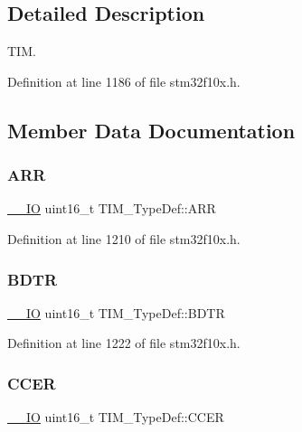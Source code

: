\subsection{Detailed Description}
T\+IM. 

Definition at line 1186 of file stm32f10x.\+h.



\subsection{Member Data Documentation}
\mbox{\label{struct_t_i_m___type_def_a32ceda49b331ef9f61567ef9ffdf045e}} 
\subsubsection{\texorpdfstring{A\+RR}{ARR}}
{\footnotesize\ttfamily \hyperlink{core__sc300_8h_aec43007d9998a0a0e01faede4133d6be}{\+\_\+\+\_\+\+IO} uint16\+\_\+t T\+I\+M\+\_\+\+Type\+Def\+::\+A\+RR}



Definition at line 1210 of file stm32f10x.\+h.

\mbox{\label{struct_t_i_m___type_def_a32bbedb8b418359c6873375ec949cf8b}} 
\subsubsection{\texorpdfstring{B\+D\+TR}{BDTR}}
{\footnotesize\ttfamily \hyperlink{core__sc300_8h_aec43007d9998a0a0e01faede4133d6be}{\+\_\+\+\_\+\+IO} uint16\+\_\+t T\+I\+M\+\_\+\+Type\+Def\+::\+B\+D\+TR}



Definition at line 1222 of file stm32f10x.\+h.

\mbox{\label{struct_t_i_m___type_def_a2a7ebf9d3041dc20da591668d916f5bc}} 
\subsubsection{\texorpdfstring{C\+C\+ER}{CCER}}
{\footnotesize\ttfamily \hyperlink{core__sc300_8h_aec43007d9998a0a0e01faede4133d6be}{\+\_\+\+\_\+\+IO} uint16\+\_\+t T\+I\+M\+\_\+\+Type\+Def\+::\+C\+C\+ER}



